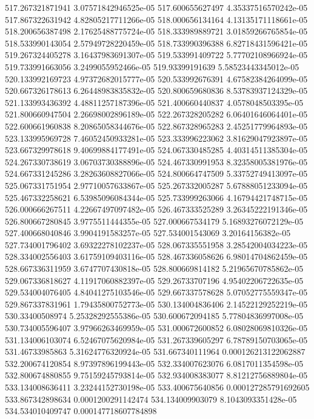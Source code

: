 {517.267321871941 3.07571842946525e-05
517.600655627497 4.35337516570242e-05
517.867322631942 4.82805217711266e-05
518.000656134164 4.13135171118661e-05
518.200656387498 2.17625488775724e-05
518.333989889721 3.01859266765854e-05
518.533990143054 2.57949728220459e-05
518.733990396388 6.82718431596421e-05
519.267324405278 3.16437983691307e-05
519.533991409722 5.77702108966924e-05
519.733991663056 3.2499055952466e-05
519.93399191639 5.58523443345012e-05
520.133992169723 4.97372682015777e-05
520.533992676391 4.67582384264099e-05
520.667326178613 6.26448983835832e-05
520.800659680836 8.53783937124329e-05
521.133993436392 4.48811257187396e-05
521.400660440837 4.0578048503395e-05
521.800660947504 2.26698002896189e-05
522.267328205282 6.06401646064401e-05
522.600661960838 8.20865058344676e-05
522.867328965283 2.45251779964893e-05
523.133995969728 7.46052450933281e-05
523.333996223062 3.81629047923897e-05
523.667329978618 9.40699884177491e-05
524.067330485285 4.40314511385304e-05
524.267330738619 3.06703730388896e-05
524.467330991953 8.32358005381976e-05
524.667331245286 3.28263608827066e-05
524.800664747509 5.33752749413097e-05
525.067331751954 2.97710057633867e-05
525.267332005287 5.67888051233094e-05
525.467332258621 6.53985096084344e-05
525.733999263066 4.16794421748715e-05
526.000666267511 4.22667497097482e-05
526.467333525289 3.26345222191346e-05
526.800667280845 3.9775511444355e-05
527.000667534179 5.16893276072129e-05
527.400668040846 3.9904191583257e-05
527.534001543069 3.20164156382e-05
527.734001796402 3.69322278102237e-05
528.067335551958 3.28542004034223e-05
528.334002556403 3.61759109403116e-05
528.467336058626 6.98014704862459e-05
528.667336311959 3.6747707430818e-05
528.800669814182 5.21965670785862e-05
529.067336818627 4.11917060882397e-05
529.26733707196 4.95402206722635e-05
529.534004076405 4.84041275103546e-05
529.667337578628 5.07052775559347e-05
529.867337831961 1.79435800752773e-05
530.134004836406 2.14522129252219e-05
530.33400508974 5.25328292555386e-05
530.600672094185 5.77804836997008e-05
530.734005596407 3.97966263469959e-05
531.000672600852 6.08028069810326e-05
531.134006103074 6.52467075620984e-05
531.267339605297 6.78789150703065e-05
531.46733985863 5.31624776320924e-05
531.667340111964 0.000126213122062887
532.200674120854 8.97397896199443e-05
532.334007623076 6.0817011354598e-05
532.800674880855 9.75159245793814e-05
532.934008383077 8.81212756889804e-05
533.134008636411 3.23244152730198e-05
533.400675640856 0.000127285791692605
533.867342898634 0.0001200291142474
534.134009903079 8.1043093351428e-05
534.534010409747 0.000147718607784898
}
